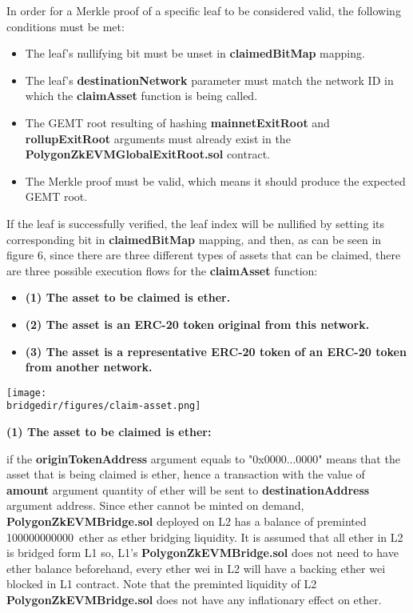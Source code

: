 In order for a Merkle proof of a specific leaf to be considered valid, the following conditions must be met:
	\begin{itemize}
		\item The leaf's nullifying bit must be unset in \textbf{claimedBitMap} mapping.
		\item The leaf's \textbf{destinationNetwork} parameter must match the network ID in which the \textbf{claimAsset} function is being called.
		\item The GEMT root resulting of hashing \textbf{mainnetExitRoot} and \textbf{rollupExitRoot} arguments must already exist in the \textbf{PolygonZkEVMGlobalExitRoot.sol} contract.
		\item The Merkle proof must be valid, which means it should produce the expected GEMT root.
	\end{itemize}
	
	  
If the leaf is successfully verified, the leaf index will be nullified by setting its corresponding bit in \textbf{claimedBitMap} mapping, and then, as can be seen in figure 6, since there are three different types of assets that can be claimed, there are three possible execution flows for the \textbf{claimAsset} function:
	
\begin{itemize}
	\item \textbf{(1) The asset to be claimed is ether.}
	\item \textbf{(2) The asset is an ERC-20 token original from this network.}
	\item \textbf{(3) The asset is a representative ERC-20 token of an ERC-20 token from another network.}
\end{itemize}
	
\begin{center}
	\texttt{[image: \\bridgedir/figures/claim-asset.png]}
		
	
\end{center}
	
\textbf{(1) The asset to be claimed is ether:}

if the \textbf{originTokenAddress} argument equals to "0x0000...0000" means that the asset that is being claimed is ether, hence a transaction with the value of \textbf{amount} argument quantity of ether will be sent to \textbf{destinationAddress} argument address.
Since ether cannot be minted on demand, \textbf{PolygonZkEVMBridge.sol} deployed on L2 has a balance of preminted 100000000000 ether as ether bridging liquidity. It is assumed that all ether in L2 is bridged form L1 so, L1's \textbf{PolygonZkEVMBridge.sol} does not need to have ether balance beforehand, every ether wei in L2 will have a backing ether wei blocked in L1 contract. Note that the preminted liquidity of L2 \textbf{PolygonZkEVMBridge.sol} does not have any inflationary effect on ether.
	
